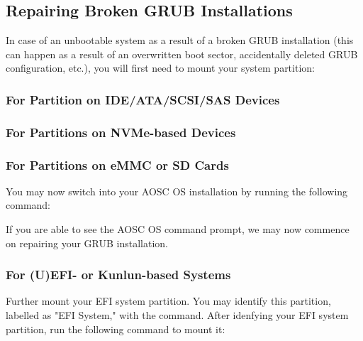     \subsection{Repairing Broken GRUB Installations}

    In case of an unbootable system as a result of a broken GRUB installation (this can happen as a result of an overwritten boot sector, accidentally deleted GRUB configuration, etc.), you will first need to mount your system partition:

    \subsubsection*{For Partition on IDE/ATA/SCSI/SAS Devices}


    \subsubsection*{For Partitions on NVMe-based Devices}


    \subsubsection*{For Partitions on eMMC or SD Cards}


    You may now switch into your AOSC OS installation by running the following command:


    If you are able to see the AOSC OS command prompt, we may now commence on repairing your GRUB installation.

    \subsubsection*{For (U)EFI- or Kunlun-based Systems}

    Further mount your EFI system partition. You may identify this partition,
    labelled as "EFI System," with the  command. After idenfying your EFI system partition,
    run the following command to mount it:

